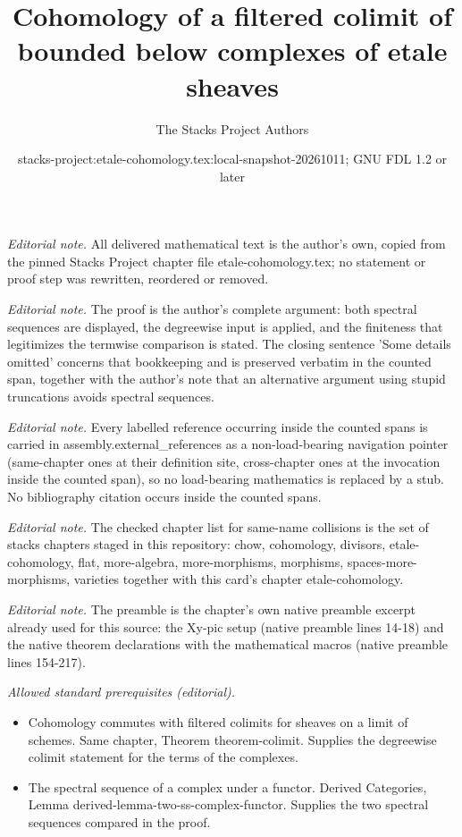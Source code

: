 \documentclass[10pt,a4paper]{amsart}
\title{Cohomology of a filtered colimit of bounded below complexes of etale sheaves}
\author{The Stacks Project Authors}
\date{stacks-project:etale-cohomology.tex:local-snapshot-20261011; GNU FDL 1.2 or later}
\theoremstyle{plain}
\theoremstyle{definition}
\theoremstyle{remark}
\numberwithin{equation}{subsection}
\begin{document}
\maketitle
\noindent\textit{Editorial note.} All delivered mathematical text is the author's own, copied from the pinned Stacks Project chapter file etale-cohomology.tex; no statement or proof step was rewritten, reordered or removed.\par\medskip
\noindent\textit{Editorial note.} The proof is the author's complete argument: both spectral sequences are displayed, the degreewise input is applied, and the finiteness that legitimizes the termwise comparison is stated. The closing sentence 'Some details omitted' concerns that bookkeeping and is preserved verbatim in the counted span, together with the author's note that an alternative argument using stupid truncations avoids spectral sequences.\par\medskip
\noindent\textit{Editorial note.} Every labelled reference occurring inside the counted spans is carried in assembly.external\_references as a non-load-bearing navigation pointer (same-chapter ones at their definition site, cross-chapter ones at the invocation inside the counted span), so no load-bearing mathematics is replaced by a stub. No bibliography citation occurs inside the counted spans.\par\medskip
\noindent\textit{Editorial note.} The checked chapter list for same-name collisions is the set of stacks chapters staged in this repository: chow, cohomology, divisors, etale-cohomology, flat, more-algebra, more-morphisms, morphisms, spaces-more-morphisms, varieties together with this card's chapter etale-cohomology.\par\medskip
\noindent\textit{Editorial note.} The preamble is the chapter's own native preamble excerpt already used for this source: the Xy-pic setup (native preamble lines 14-18) and the native theorem declarations with the mathematical macros (native preamble lines 154-217).\par\medskip
\noindent\textit{Allowed standard prerequisites (editorial).}\begin{itemize}
\item Cohomology commutes with filtered colimits for sheaves on a limit of schemes. Same chapter, Theorem theorem-colimit. Supplies the degreewise colimit statement for the terms of the complexes.
\item The spectral sequence of a complex under a functor. Derived Categories, Lemma derived-lemma-two-ss-complex-functor. Supplies the two spectral sequences compared in the proof.
\end{itemize}\medskip
\end{document}
